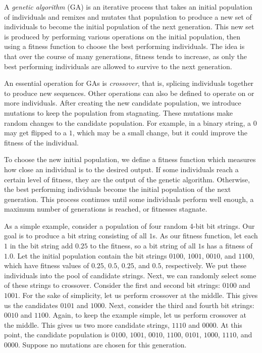A \textit{genetic algorithm} (GA) is an iterative process that takes an initial population of individuals and remixes and mutates that population to produce a new set of individuals to become the initial population of the next generation.
This new set is produced by performing various operations on the initial population, then using a fitness function to choose the best performing individuals.
The idea is that over the course of many generations, fitness tends to increase, as only the best performing individuals are allowed to survive to the next generation.

An essential operation for GAs is \textit{crossover}, that is, splicing individuals together to produce new sequences.
Other operations can also be defined to operate on or more individuals.
After creating the new candidate population, we introduce mutations to keep the population from stagnating.
These mutations make random changes to the candidate population.
For example, in a binary string, a $0$ may get flipped to a $1$, which may be a small change, but it could improve the fitness of the individual.

To choose the new initial population, we define a fitness function which measures how close an individual is to the desired output.
If some individuals reach a certain level of fitness, they are the output of the genetic algorithm.
Otherwise, the best performing individuals become the initial population of the next generation.
This process continues until some individuals perform well enough, a maximum number of generations is reached, or fitnesses stagnate.

As a simple example, consider a population of four random 4-bit bit strings.
Our goal is to produce a bit string consisting of all $1$s.
As our fitness function, let each $1$ in the bit string add $0.25$ to the fitness, so a bit string of all $1$s has a fitness of $1.0$.
Let the initial population contain the bit strings $0100$, $1001$, $0010$, and $1100$, which have fitness values of $0.25$, $0.5$, $0.25$, and $0.5$, respectively.
We put these individuals into the pool of candidate strings.
Next, we can randomly select some of these strings to crossover.
Consider the first and second bit strings: $0100$ and $1001$.
For the sake of simplicity, let us perform crossover at the middle.
This gives us the candidates $0101$ and $1000$.
Next, consider the third and fourth bit strings: $0010$ and $1100$.
Again, to keep the example simple, let us perform crossover at the middle.
This gives us two more candidate strings, $1110$ and $0000$.
At this point, the candidate population is $0100$, $1001$, $0010$, $1100$, $0101$, $1000$, $1110$, and $0000$.
Suppose no mutations are chosen for this generation.

